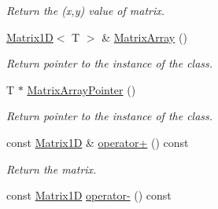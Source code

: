 \begin{DoxyCompactItemize}
\begin{DoxyCompactList}\small\item\em Return the (x,y) value of matrix. \end{DoxyCompactList}\item 
\hypertarget{class_matrix1_d_acc739d3cd3e0d4adeb412a933f79fc4c}{}\hyperlink{class_matrix1_d}{Matrix1\+D}$<$ T $>$ \& \hyperlink{class_matrix1_d_acc739d3cd3e0d4adeb412a933f79fc4c}{Matrix\+Array} ()\label{class_matrix1_d_acc739d3cd3e0d4adeb412a933f79fc4c}

\begin{DoxyCompactList}\small\item\em Return pointer to the instance of the class. \end{DoxyCompactList}\item 
\hypertarget{class_matrix1_d_a670c0ae686a26451b62968fe18642a43}{}T $\ast$ \hyperlink{class_matrix1_d_a670c0ae686a26451b62968fe18642a43}{Matrix\+Array\+Pointer} ()\label{class_matrix1_d_a670c0ae686a26451b62968fe18642a43}

\begin{DoxyCompactList}\small\item\em Return pointer to the instance of the class. \end{DoxyCompactList}\item 
\hypertarget{class_matrix1_d_a81a7c25f8ddad069cb697c76ddfc1163}{}const \hyperlink{class_matrix1_d}{Matrix1\+D} \& \hyperlink{class_matrix1_d_a81a7c25f8ddad069cb697c76ddfc1163}{operator+} () const \label{class_matrix1_d_a81a7c25f8ddad069cb697c76ddfc1163}

\begin{DoxyCompactList}\small\item\em Return the matrix. \end{DoxyCompactList}\item 
\hypertarget{class_matrix1_d_ae3249d47e7cd8a048ad576bbceaa5a6f}{}const \hyperlink{class_matrix1_d}{Matrix1\+D} \hyperlink{class_matrix1_d_ae3249d47e7cd8a048ad576bbceaa5a6f}{operator-\/} () const \label{class_matrix1_d_ae3249d47e7cd8a048ad576bbceaa5a6f}


\end{DoxyCompactItemize}
